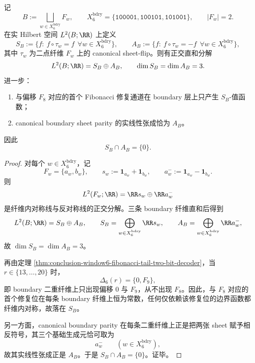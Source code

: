 \begin{theorem}\label{thm:conclusion-window6-boundary-symmetric-antisymmetric-splitting}
记
\[
B:=\bigsqcup_{w\in X_6^{\mathrm{bdry}}}F_w,
\qquad
X_6^{\mathrm{bdry}}=\{\texttt{100001},\texttt{100101},\texttt{101001}\},
\qquad
|F_w|=2.
\]
在实 Hilbert 空间 \(L^2(B;\RR)\) 上定义
\[
S_B:=\{f:\ f\circ\tau_w=f\ \ \forall w\in X_6^{\mathrm{bdry}}\},
\qquad
A_B:=\{f:\ f\circ\tau_w=-f\ \ \forall w\in X_6^{\mathrm{bdry}}\},
\]
其中 \(\tau_w\) 为二点纤维 \(F_w\) 上的 canonical sheet-flip。则有正交直和分解
\[
L^2(B;\RR)=S_B\oplus A_B,
\qquad
\dim S_B=\dim A_B=3.
\]
进一步：
\begin{enumerate}
  \item 与偏移 \(F_8\) 对应的首个 Fibonacci 修复通道在 boundary 层上只产生 \(S_B\)-值函数；
  \item canonical boundary sheet parity 的实线性张成恰为 \(A_B\)。
\end{enumerate}
因此
\[
S_B\cap A_B=\{0\}.
\]
\end{theorem}
\begin{proof}
对每个 \(w\in X_6^{\mathrm{bdry}}\)，记
\[
F_w=\{a_w,b_w\},
\qquad
s_w:=\mathbf 1_{a_w}+\mathbf 1_{b_w},
\qquad
a_w^-:=\mathbf 1_{a_w}-\mathbf 1_{b_w}.
\]
则
\[
L^2(F_w;\RR)=\RR s_w\oplus \RR a_w^-
\]
是纤维内对称线与反对称线的正交分解。三条 boundary 纤维直和后得到
\[
L^2(B;\RR)=S_B\oplus A_B,
\qquad
S_B=\bigoplus_{w\in X_6^{\mathrm{bdry}}}\RR s_w,
\qquad
A_B=\bigoplus_{w\in X_6^{\mathrm{bdry}}}\RR a_w^-,
\]
故 \(\dim S_B=\dim A_B=3\)。

再由定理 \ref{thm:conclusion-window6-fibonacci-tail-two-bit-decoder}，当 \(r\in\{13,\dots,20\}\) 时，
\[
\Delta_6(r)=\{0,F_9\},
\]
即 boundary 二重纤维上只出现偏移 \(0\) 与 \(F_9\)，从不出现 \(F_8\)。因此，与 \(F_8\) 对应的首个修复位在每条 boundary 纤维上恒为常数，任何仅依赖该修复位的边界函数都纤维内对称，故落在 \(S_B\)。

另一方面，canonical boundary parity 在每条二重纤维上正是把两张 sheet 赋予相反符号，其三个基础生成元恰可取为
\[
a_w^-\qquad (w\in X_6^{\mathrm{bdry}}),
\]
故其实线性张成正是 \(A_B\)。于是 \(S_B\cap A_B=\{0\}\)。证毕。
\end{proof}

